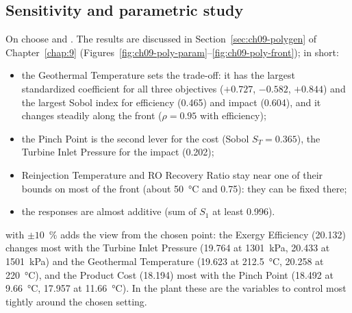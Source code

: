 \subsection{Sensitivity and parametric study}
On  choose   and  . The results are discussed in Section~\ref{sec:ch09-polygen} of Chapter~\ref{chap:9}
(Figures~\ref{fig:ch09-poly-param}--\ref{fig:ch09-poly-front}); in short:
\begin{itemize}
  \item the Geothermal Temperature sets the trade-off: it has the largest standardized coefficient for all three
        objectives ($+0.727$, $-0.582$, $+0.844$) and the largest Sobol index for efficiency (0.465) and impact
        (0.604), and it changes steadily along the front ($\rho=0.95$ with efficiency);
  \item the Pinch Point is the second lever for the cost (Sobol $S_T=0.365$), the Turbine Inlet Pressure for the
        impact (0.202);
  \item Reinjection Temperature and RO Recovery Ratio stay near one of their bounds on most of the front (about
        50~°C and 0.75): they can be fixed there;
  \item the responses are almost additive (sum of $S_1$ at least 0.996).
\end{itemize}
 with $\pm10$~\% adds the view from the chosen point: the Exergy Efficiency (20.132)
changes most with the Turbine Inlet Pressure (19.764 at 1301~kPa, 20.433 at 1501~kPa) and the Geothermal Temperature
(19.623 at 212.5~°C, 20.258 at 220~°C), and the Product Cost (18.194) most with the Pinch Point (18.492 at 9.66~°C,
17.957 at 11.66~°C). In the plant these are the variables to control most tightly around the chosen setting.

